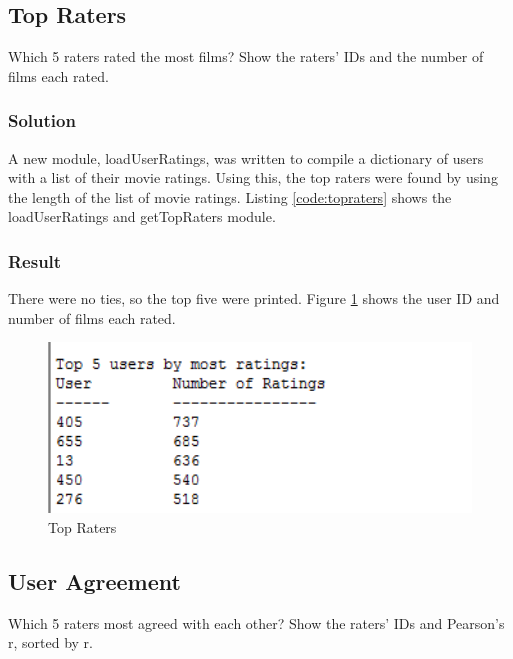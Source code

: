 \documentclass[paper=a4, fontsize=11pt]{scrartcl} %
\numberwithin{equation}{section} %
\numberwithin{figure}{section} %
\numberwithin{table}{section} %
\begin{document}

\subsection{Top Raters}
Which 5 raters rated the most films? 
Show the raters' IDs and the number of films each rated.

\subsubsection{Solution}
A new module, loadUserRatings, was written to compile a dictionary of users with a list of their movie ratings.
Using this, the top raters were found by using the length of the list of movie ratings.
Listing \ref{code:topraters} shows the loadUserRatings and getTopRaters module.\\



\subsubsection{Result}
There were no ties, so the top five were printed.
Figure \ref{fig:topraters} shows the user ID and number of films each rated.

\begin{figure}[H]
\includegraphics[width=1\textwidth]{pics/topRaters}
\caption{Top Raters}
\label{fig:topraters}
\end{figure}


\subsection{User Agreement}
Which 5 raters most agreed with each other? 
Show the raters' IDs and Pearson's r, sorted by r.
\end{document}
